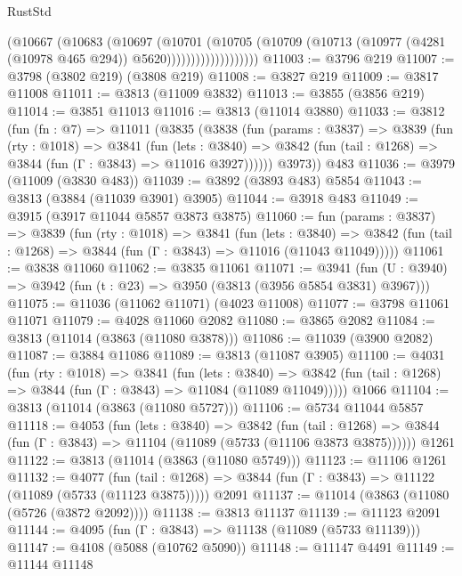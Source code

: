 \begin{lexlean}{RustStd}
\begin{coremodule}
{\begin{coremodule}
{{{{{{{{{{{{{{{{{{{{{{{{{{{{{{{{{{{                          (@10667
                            (@10683
                              (@10697
                                (@10701
                                  (@10705
                                    (@10709
                                      (@10713
                                        (@10977 (@4281 (@10978 @465 @294)) @5620)))))))))))))))))))
@11003 := @3796 @219
@11007 := @3798 (@3802 @219) (@3808 @219)
@11008 := @3827 @219
@11009 := @3817 @11008
@11011 := @3813 (@11009 @3832)
@11013 := @3855 (@3856 @219)
@11014 := @3851 @11013
@11016 := @3813 (@11014 @3880)
@11033 := @3812
    (fun (fn : @7) =>
    @11011
      (@3835
        (@3838
          (fun (params : @3837) =>
          @3839
            (fun (rty : @1018) =>
            @3841
              (fun (lets : @3840) =>
              @3842 (fun (tail : @1268) => @3844 (fun (Γ : @3843) => @11016 @3927))))))
        @3973))
    @483
@11036 := @3979 (@11009 (@3830 @483))
@11039 := @3892 (@3893 @483) @5854
@11043 := @3813 (@3884 (@11039 @3901) @3905)
@11044 := @3918 @483
@11049 := @3915 (@3917 @11044 @5857 @3873 @3875)
@11060 := fun (params : @3837) =>
  @3839
    (fun (rty : @1018) =>
    @3841
      (fun (lets : @3840) =>
      @3842 (fun (tail : @1268) => @3844 (fun (Γ : @3843) => @11016 (@11043 @11049)))))
@11061 := @3838 @11060
@11062 := @3835 @11061
@11071 := @3941
    (fun (U : @3940) => @3942 (fun (t : @23) => @3950 (@3813 (@3956 @5854 @3831) @3967)))
@11075 := @11036 (@11062 @11071) (@4023 @11008)
@11077 := @3798 @11061 @11071
@11079 := @4028 @11060 @2082
@11080 := @3865 @2082
@11084 := @3813 (@11014 (@3863 (@11080 @3878)))
@11086 := @11039 (@3900 @2082)
@11087 := @3884 @11086
@11089 := @3813 (@11087 @3905)
@11100 := @4031
    (fun (rty : @1018) =>
    @3841
      (fun (lets : @3840) =>
      @3842 (fun (tail : @1268) => @3844 (fun (Γ : @3843) => @11084 (@11089 @11049)))))
    @1066
@11104 := @3813 (@11014 (@3863 (@11080 @5727)))
@11106 := @5734 @11044 @5857
@11118 := @4053
    (fun (lets : @3840) =>
    @3842
      (fun (tail : @1268) =>
      @3844 (fun (Γ : @3843) => @11104 (@11089 (@5733 (@11106 @3873 @3875))))))
    @1261
@11122 := @3813 (@11014 (@3863 (@11080 @5749)))
@11123 := @11106 @1261
@11132 := @4077
    (fun (tail : @1268) => @3844 (fun (Γ : @3843) => @11122 (@11089 (@5733 (@11123 @3875)))))
    @2091
@11137 := @11014 (@3863 (@11080 (@5726 (@3872 @2092))))
@11138 := @3813 @11137
@11139 := @11123 @2091
@11144 := @4095 (fun (Γ : @3843) => @11138 (@11089 (@5733 @11139)))
@11147 := @4108 (@5088 (@10762 @5090))
@11148 := @11147 @4491
@11149 := @11144 @11148
}}}}}}}}}}}}}}}}}}}}}}}}}}}}}}}}}}}
\end{coremodule}}
\end{coremodule}
\end{lexlean}

